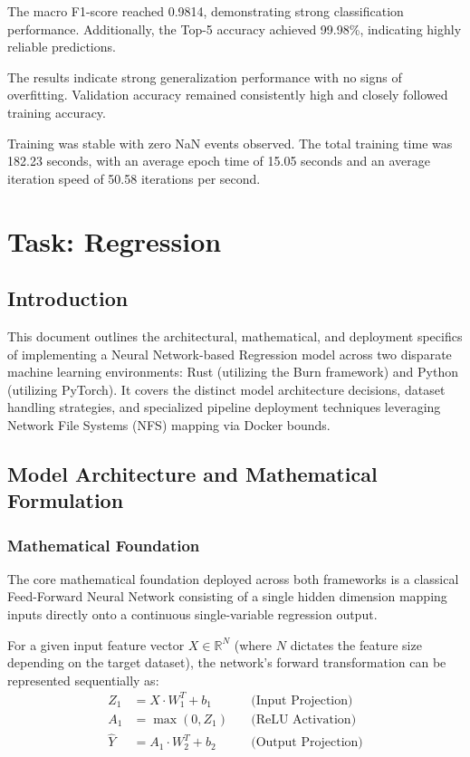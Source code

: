 \documentclass{ieeeaccess}
\begin{document}
The macro F1-score reached 0.9814, demonstrating strong classification performance. Additionally, the Top-5 accuracy achieved 99.98\%, indicating highly reliable predictions.



The results indicate strong generalization performance with no signs of overfitting. Validation accuracy remained consistently high and closely followed training accuracy.

Training was stable with zero NaN events observed. The total training time was 182.23 seconds, with an average epoch time of 15.05 seconds and an average iteration speed of 50.58 iterations per second.



\section{Task: Regression}

\subsection{Introduction}
This document outlines the architectural, mathematical, and deployment specifics of implementing a Neural Network-based Regression model across two disparate machine learning environments: Rust (utilizing the Burn framework) and Python (utilizing PyTorch). It covers the distinct model architecture decisions, dataset handling strategies, and specialized pipeline deployment techniques leveraging Network File Systems (NFS) mapping via Docker bounds.

\subsection{Model Architecture and Mathematical Formulation}

\subsubsection{Mathematical Foundation}
The core mathematical foundation deployed across both frameworks is a classical Feed-Forward Neural Network consisting of a single hidden dimension mapping inputs directly onto a continuous single-variable regression output.

For a given input feature vector $X \in \mathbb{R}^N$ (where $N$ dictates the feature size depending on the target dataset), the network's forward transformation can be represented sequentially as:
\begin{align}
    Z_1 &= X \cdot W_1^T + b_1 \quad &\text{(Input Projection)} \\
    A_1 &= \max(0, Z_1)        \quad &\text{(ReLU Activation)} \\
    \hat{Y} &= A_1 \cdot W_2^T + b_2 \quad &\text{(Output Projection)}
\end{align}
\end{document}
